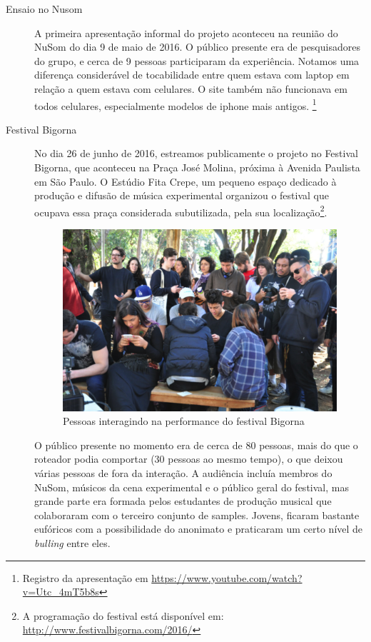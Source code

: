 \begin{description}

\item[Ensaio no Nusom] 
A primeira apresentação informal do projeto aconteceu na reunião do NuSom do dia 9 de maio de 2016. O público presente era de pesquisadores do grupo, e cerca de 9 pessoas participaram da experiência. Notamos uma diferença considerável de tocabilidade entre quem estava com laptop em relação a quem estava com celulares. O site também não funcionava em todos celulares, especialmente modelos de iphone mais antigos. \footnote{Registro da apresentação em \url{https://www.youtube.com/watch?v=Utc_4mT5b8s}}

\item[Festival Bigorna]
No dia 26 de junho de 2016, estreamos publicamente o projeto no Festival Bigorna, que aconteceu na Praça José Molina, próxima à Avenida Paulista em São Paulo. O Estúdio Fita Crepe, um pequeno espaço dedicado à produção e difusão de música experimental organizou o festival que ocupava essa praça considerada subutilizada, pela sua localização\footnote{A programação do festival está disponível em: \url{http://www.festivalbigorna.com/2016/}}.

\begin{figure}[!ht]
        \includegraphics[width=1\textwidth]{pictures/bigorna}
        \vspace{-10pt}
    \caption{Pessoas interagindo na performance do festival Bigorna}
    \label{fig:performer}
\end{figure}

O público presente no momento era de cerca de 80 pessoas, mais do que o roteador podia comportar (30 pessoas ao mesmo tempo), o que deixou várias pessoas de fora da interação. A audiência incluía membros do NuSom, músicos da cena experimental e o público geral do festival, mas grande parte era formada pelos estudantes de produção musical que colaboraram com o terceiro conjunto de samples. Jovens, ficaram bastante eufóricos com a possibilidade do anonimato e praticaram um certo nível de \emph{bulling} entre eles. 


\end{description}
